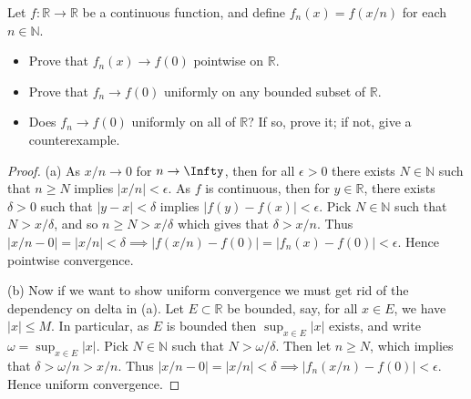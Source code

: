\documentclass[oneside]{amsart}
\theoremstyle{definition}
\newcommand{\rr}{\mathbb R}
\newcommand{\nn}{\mathbb N}
\begin{document}
\begin{tcolorbox}[colback=black!5!white,colframe=black!75!black,title= Exercise $5.3.$] Let $f \colon \rr \to \rr$ be a continuous function, and define $f_n (x) = f(x/n)$ for each $n \in \nn$.
\begin{itemize}
	\item [(a)] Prove that $f_n(x) \to f(0)$ pointwise on $\rr$.
	\item [(b)] Prove that $f_n \to f(0)$ uniformly on any bounded subset of $\rr$.
	\item [(c)] Does $f_n \to f(0)$ uniformly on all of $\rr$? If so, prove it; if not, give a counterexample. 
\end{itemize}
\tcblower 
\begin{proof}  (a) As $x/n \to 0$ for $n \to \Infty$, then for all $\epsilon > 0$ there exists $N \in \nn$ such that $n \geq N$ implies $|x/n|< \epsilon$. As $f$ is continuous, then for $y \in \rr$, there exists $\delta > 0$ such that $|y-x|<\delta$ implies $|f(y)-f(x)| < \epsilon$. Pick $N \in \nn$ such that $ N>x/\delta $, and so $n\geq N > x/\delta$ which gives that $\delta > x/n$. Thus $ |x/n-0| = |x/n| < \delta \implies |f(x/n) - f(0)| = |f_n(x) - f(0)| <\epsilon$. Hence pointwise convergence.

(b) Now if we want to show uniform convergence we must get rid of the dependency on delta in (a). Let $E \subset \rr$ be bounded, say, for all $x \in E$, we have $|x|\leq M$. In particular, as $E$ is bounded then $\sup_{x \in E} |x|$ exists, and write $\omega = \sup_{x \in E} |x|$. Pick $N \in \nn$ such that $N>\omega/\delta$. Then let $n \geq N$, which implies that $\delta > \omega/n > x/n$. Thus $|x/n-0|  = |x/n| < \delta \implies |f_n(x/n)-f(0)|<\epsilon$. Hence uniform convergence.  
\end{proof} 
\end{tcolorbox}
\end{document}
